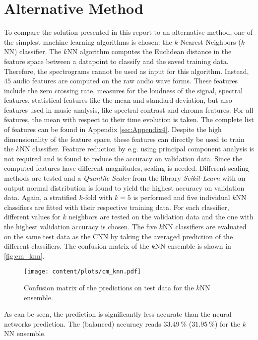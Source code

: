 \section{Alternative Method}
\label{sec:alternative}
To compare the solution presented in this report to an alternative method, one of the simplest machine learning algorithms is chosen: the $k$-Nearest Neighbors ($k$NN) classifier.
The $k$NN algorithm computes the Euclidean distance in the feature space between a datapoint to classify and the saved training data. Therefore, the spectrograms cannot be used 
as input for this algorithm. Instead, $\num{45}$ audio features are computed on the raw audio wave forms. These features include the zero crossing rate, measures for the loudness of 
the signal, spectral features, statistical features like the mean and standard deviation, but also features used in music analysis, like spectral contrast and chroma features.
For all features, the mean with respect to their time evolution is taken.
The complete list of features can be found in Appendix \ref{sec:Appendix4}. 
Despite the high dimensionality of the feature space, these features can directly be used to train the $k$NN classifier. Feature reduction by e.g. using principal component 
analysis is not required and is found to reduce the accuracy on validation data.
Since the computed features have different magnitudes, scaling is needed. Different scaling methods are tested and a \textit{Quantile Scaler} from the library \textit{Scikit-Learn} 
\cite{scikit-learn} with an output normal distribution is found to yield the highest accuracy on validation data.
Again, a stratified $k$-fold with $k=5$ is performed and five individual $k$NN classifiers are fitted 
with their respective training data. For each classifier, different values for $k$ neighbors are tested on the validation data and the one with the highest validation accuracy is chosen.
The five $k$NN classifiers are evaluated on the same test data as the CNN by taking the averaged prediction of the different classifiers.
The confusion matrix of the $k$NN ensemble is shown in \autoref{fig:cm_knn}.
\begin{figure}
    \centering
    \texttt{[image: content/plots/cm\_knn.pdf]}
    \caption{Confusion matrix of the predictions on test data for the $k$NN ensemble.}
    \label{fig:cm_knn}
\end{figure}
As can be seen, the prediction is significantly less accurate than the neural networks prediction.
The (balanced) accuracy reads $\qty{33.49}{\percent}$ ($\qty{31.95}{\percent}$) for the $k$NN ensemble.
